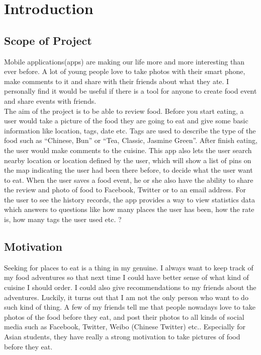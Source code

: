 \chapter{Introduction}


\section{Scope of Project} %
\label{sec:scope_of_project}
Mobile applications(apps) are making our life more and more interesting than ever before. A lot of young people love to take photos with their smart phone, make comments to it and share with their friends about what they ate. I personally find it would be useful if there is a tool for anyone to create food event and share events with friends.\\

The aim of the project is to be able to review food. Before you start eating, a user would take a picture of the food they are going to eat and give some basic information like location, tags, date etc. Tags are used to describe the type of the food such as ``Chinese, Bun'' or ``Tea, Classic, Jasmine Green''. After finish eating, the user would make comments to the cuisine. This app also lets the user search nearby location or location defined by the user, which will show a list of pins on the map indicating the user had been there before, to decide what the user want to eat. When the user saves a food event, he or she also have the ability to share the review and photo of food to Facebook, Twitter or to an email address. For the user to see the history records, the app provides a way to view statistics data which answers to questions like how many places the user has been, how the rate is, how many tags the user used etc. ?
 

\section{Motivation} %
\label{sec:motivation}
Seeking for places to eat is a thing in my genuine. I always want to keep track of my food adventures so that next time I could have better sense of what kind of cuisine I should order. I could also give recommendations to my friends about the adventures. Luckily, it turns out that I am not the only person who want to do such kind of thing. A few of my friends tell me that people nowadays love to take photos of the food before they eat, and post their photos to all kinds of social media such as Facebook, Twitter, Weibo (Chinese Twitter) etc.. Especially for Asian students, they have really  a strong motivation to take pictures of food before they eat. \\

